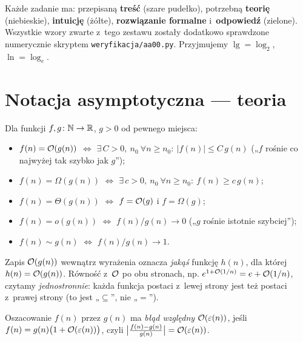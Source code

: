 \documentclass[11pt]{article}
\begin{document}

\begin{teoria}
Każde zadanie ma: przepisaną \textbf{treść} (szare pudełko), potrzebną
\textbf{teorię} (niebieskie), \textbf{intuicję} (żółte), \textbf{rozwiązanie
formalne} i~\textbf{odpowiedź} (zielone). Wszystkie wzory zwarte z~tego zestawu
zostały dodatkowo sprawdzone numerycznie skryptem \texttt{weryfikacja/aa00.py}.
Przyjmujemy $\lg = \log_2$, $\ln = \log_e$.
\end{teoria}

\section{Notacja asymptotyczna --- teoria}

\begin{definicja}
Dla funkcji $f,g\colon\mathbb{N}\to\mathbb{R}$, $g>0$ od pewnego miejsca:
\begin{itemize}
  \item $f(n) = \mathcal{O}(g(n))$ $\iff$ $\exists\, C>0,\ n_0\ \forall n\ge n_0:\ |f(n)|\le C\,g(n)$
        („$f$ rośnie co najwyżej tak szybko jak $g$”);
  \item $f(n) = \Omega(g(n))$ $\iff$ $\exists\, c>0,\ n_0\ \forall n\ge n_0:\ f(n)\ge c\,g(n)$;
  \item $f(n) = \Theta(g(n))$ $\iff$ $f=\mathcal{O}(g)$ i $f=\Omega(g)$;
  \item $f(n) = o(g(n))$ $\iff$ $f(n)/g(n)\to 0$ („$g$ rośnie istotnie szybciej”);
  \item $f(n) \sim g(n)$ $\iff$ $f(n)/g(n)\to 1$.
\end{itemize}
\end{definicja}

\begin{definicja}
Zapis $\mathcal{O}(g(n))$ wewnątrz wyrażenia oznacza \emph{jakąś} funkcję $h(n)$, dla
której $h(n)=\mathcal{O}(g(n))$. Równość z~$\mathcal{O}$ po obu stronach, np.
$e^{1+\mathcal{O}(1/n)} = e+\mathcal{O}(1/n)$, czytamy \emph{jednostronnie}: każda funkcja postaci
z~lewej strony jest też postaci z~prawej strony (to jest „$\subseteq$”, nie „$=$”).
\end{definicja}

\begin{definicja}
Oszacowanie $f(n)$ przez $g(n)$ ma \emph{błąd względny} $\mathcal{O}(\varepsilon(n))$,
jeśli $f(n) = g(n)\bigl(1+\mathcal{O}(\varepsilon(n))\bigr)$, czyli
$\bigl|\frac{f(n)-g(n)}{g(n)}\bigr| = \mathcal{O}(\varepsilon(n))$.
\end{definicja}
\end{document}
